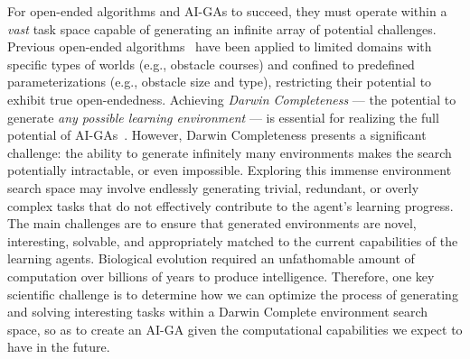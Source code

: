 \documentclass{article} %
\begin{document}
For open-ended algorithms and AI-GAs to succeed, they must operate within a \emph{vast} task space capable of generating an infinite array of potential challenges. Previous open-ended algorithms~\citep{sudhakaran_MarioGPTOpenEndedText2Level_2023,wang2023voyager,wang_PairedOpenEndedTrailblazer_2019,wang_EnhancedPOETOpenended_2020,zhang_OMNIOpenendednessModels_2023} have been applied to limited domains with specific types of worlds (e.g., obstacle courses) and confined to predefined parameterizations (e.g., obstacle size and type), restricting their potential to exhibit true open-endedness. Achieving \emph{Darwin Completeness} --- the potential to generate \emph{any possible learning environment} --- is essential for realizing the full potential of AI-GAs~\citep{clune_AIGAsAIgeneratingAlgorithms_2020}.
However, Darwin Completeness presents a significant challenge: the ability to generate infinitely many environments makes the search potentially intractable, or even impossible. Exploring this immense environment search space may involve endlessly generating trivial, redundant, or overly complex tasks that do not effectively contribute to the agent's learning progress. The main challenges are to ensure that generated environments are novel, interesting, solvable, and appropriately matched to the current capabilities of the learning agents. Biological evolution required an unfathomable amount of computation over billions of years to produce intelligence. Therefore, one key scientific challenge is to determine how we can optimize the process of generating and solving interesting tasks within a Darwin Complete environment search space, so as to create an AI-GA given the computational capabilities we expect to have in the future.
\end{document}
